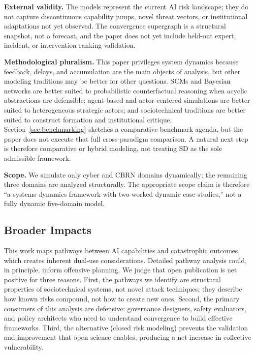 \documentclass[11pt]{article}
\begin{document}
\textbf{External validity.} The models represent the current AI risk landscape; they do not capture discontinuous capability jumps, novel threat vectors, or institutional adaptations not yet observed. The convergence supergraph is a structural snapshot, not a forecast, and the paper does not yet include held-out expert, incident, or intervention-ranking validation.

\textbf{Methodological pluralism.} This paper privileges system dynamics because feedback, delays, and accumulation are the main objects of analysis, but other modeling traditions may be better for other questions. SCMs and Bayesian networks are better suited to probabilistic counterfactual reasoning when acyclic abstractions are defensible; agent-based and actor-centered simulations are better suited to heterogeneous strategic actors; and sociotechnical traditions are better suited to construct formation and institutional critique. Section~\ref{sec:benchmarking} sketches a comparative benchmark agenda, but the paper does not execute that full cross-paradigm comparison. A natural next step is therefore comparative or hybrid modeling, not treating SD as the sole admissible framework.

\textbf{Scope.} We simulate only cyber and CBRN domains dynamically; the remaining three domains are analyzed structurally. The appropriate scope claim is therefore ``a systems-dynamics framework with two worked dynamic case studies,'' not a fully dynamic five-domain model.

\subsection{Broader Impacts}

This work maps pathways between AI capabilities and catastrophic outcomes, which creates inherent dual-use considerations. Detailed pathway analysis could, in principle, inform offensive planning. We judge that open publication is net positive for three reasons. First, the pathways we identify are structural properties of sociotechnical systems, not novel attack techniques; they describe how known risks compound, not how to create new ones. Second, the primary consumers of this analysis are defensive: governance designers, safety evaluators, and policy architects who need to understand convergence to build effective frameworks. Third, the alternative (closed risk modeling) prevents the validation and improvement that open science enables, producing a net increase in collective vulnerability.
\end{document}
